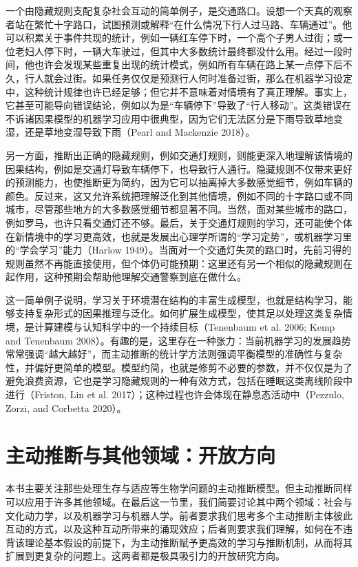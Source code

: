 一个由隐藏规则支配复杂社会互动的简单例子，是交通路口。设想一个天真的观察者站在繁忙十字路口，试图预测或解释“在什么情况下行人过马路、车辆通过”。他可以积累关于事件共现的统计，例如一辆红车停下时，一个高个子男人过街；或一位老妇人停下时，一辆大车驶过，但其中大多数统计最终都没什么用。经过一段时间，他也许会发现某些重复出现的统计模式，例如所有车辆在路上某一点停下后不久，行人就会过街。如果任务仅仅是预测行人何时准备过街，那么在机器学习设定中，这种统计规律也许已经足够；但它并不意味着对情境有了真正理解。事实上，它甚至可能导向错误结论，例如以为是“车辆停下”导致了“行人移动”。这类错误在不诉诸因果模型的机器学习应用中很典型，因为它们无法区分是下雨导致草地变湿，还是草地变湿导致下雨（Pearl and Mackenzie 2018）。

另一方面，推断出正确的隐藏规则，例如交通灯规则，则能更深入地理解该情境的因果结构，例如是交通灯导致车辆停下，也导致行人通行。隐藏规则不仅带来更好的预测能力，也使推断更为简约，因为它可以抽离掉大多数感觉细节，例如车辆的颜色。反过来，这又允许系统把理解泛化到其他情境，例如不同的十字路口或不同城市，尽管那些地方的大多数感觉细节都显著不同。当然，面对某些城市的路口，例如罗马，也许只看交通灯还不够。最后，关于交通灯规则的学习，还可能使个体在新情境中的学习更高效，也就是发展出心理学所谓的“学习定势”，或机器学习里的“学会学习”能力（Harlow 1949）。当面对一个交通灯失灵的路口时，先前习得的规则虽然不再能直接使用，但个体仍可能预期：这里还有另一个相似的隐藏规则在起作用，这种预期会帮助他理解交通警察到底在做什么。

这一简单例子说明，学习关于环境潜在结构的丰富生成模型，也就是结构学习，能够支持复杂形式的因果推理与泛化。如何扩展生成模型，使其足以处理这类复杂情境，是计算建模与认知科学中的一个持续目标（Tenenbaum et al. 2006; Kemp and Tenenbaum 2008）。有趣的是，这里存在一种张力：当前机器学习的发展趋势常常强调“越大越好”，而主动推断的统计学方法则强调平衡模型的准确性与复杂性，并偏好更简单的模型。模型约简，也就是修剪不必要的参数，并不仅仅是为了避免浪费资源，它也是学习隐藏规则的一种有效方式，包括在睡眠这类离线阶段中进行（Friston, Lin et al. 2017）；这种过程也许会体现在静息态活动中（Pezzulo, Zorzi, and Corbetta 2020）。

\section{主动推断与其他领域：开放方向}

本书主要关注那些处理生存与适应等生物学问题的主动推断模型。但主动推断同样可以应用于许多其他领域。在最后这一节里，我们简要讨论其中两个领域：社会与文化动力学，以及机器学习与机器人学。前者要求我们思考多个主动推断主体彼此互动的方式，以及这种互动所带来的涌现效应；后者则要求我们理解，如何在不违背该理论基本假设的前提下，为主动推断赋予更高效的学习与推断机制，从而将其扩展到更复杂的问题上。这两者都是极具吸引力的开放研究方向。

